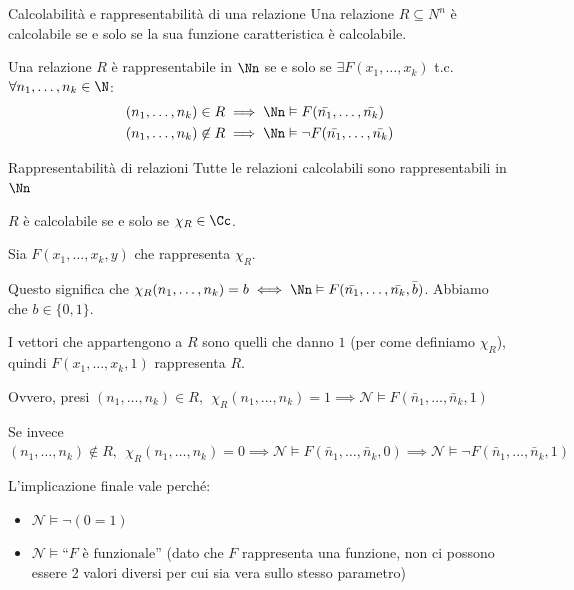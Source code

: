 \documentclass[a4paper,11pt]{report}
\begin{document}
\begin{defframe}{Calcolabilità e rappresentabilità di una relazione}{}
    Una relazione \( R \subseteq N^n \) è calcolabile se e solo se la sua funzione caratteristica è calcolabile.

    Una relazione \( R \) è rappresentabile in \( \Nn \) se e solo se \( \exists F(x_1, \dots, x_k) \) t.c. \( \forall n_1, \dots, n_k \in \N\):
    \begin{align*}
        (n_1, \dots, n_k) \in R &\implies \Nn \vDash F(\bar{n_1}, \dots, \bar{n_k}) \\
        (n_1, \dots, n_k) \not\in R &\implies \Nn \vDash \neg F(\bar{n_1}, \dots, \bar{n_k})
    \end{align*}
\end{defframe}
\begin{thmframe}{Rappresentabilità di relazioni}{}
     Tutte le relazioni calcolabili sono rappresentabili in \( \Nn \)
\end{thmframe}
\begin{pframe}
    \( R \) è calcolabile se e solo se \( \chi_R \in \Cc \).

    Sia \( F(x_1, \dots, x_k, y) \) che rappresenta \( \chi_R \).

    Questo significa che \( \chi_R(n_1, \dots, n_k)=b \iff \Nn \vDash F(\bar{n_1}, \dots, \bar{n_k}, \bar{b}) \). Abbiamo che \( b\in \{0,1\} \).

    I vettori che appartengono a \( R \) sono quelli che danno \( 1 \) (per come definiamo \( \chi_R \)), quindi \( F(x_1, \dots, x_k, 1)\) rappresenta \( R \).

    Ovvero, presi \((n_1, \dots, n_k) \in R, \ \ \chi_R(n_1, \dots, n_k) = 1  \implies \mathcal{N} \models F(\bar{n}_1, \dots, \bar{n}_k, 1) \)

Se invece $(n_1, \dots, n_k) \notin R, \ \ \chi_R(n_1, \dots, n_k) = 0 \implies \mathcal{N} \models F(\bar{n}_1, \dots, \bar{n}_k, 0)  \implies \mathcal{N} \models \neg F(\bar{n}_1, \dots, \bar{n}_k, 1)$

\begin{gframe}{}
L'implicazione finale vale perché:
\begin{itemize}
    \item \(\mathcal{N} \models \neg(0=1)\)

    \item \(\mathcal{N} \models \text{``}F \text{ è funzionale''}\)
    \subitem (dato che \(F\) rappresenta una funzione, non ci possono essere 2 valori diversi per cui sia vera sullo stesso parametro)
\end{itemize}

\end{gframe}
\end{pframe}
\end{document}
